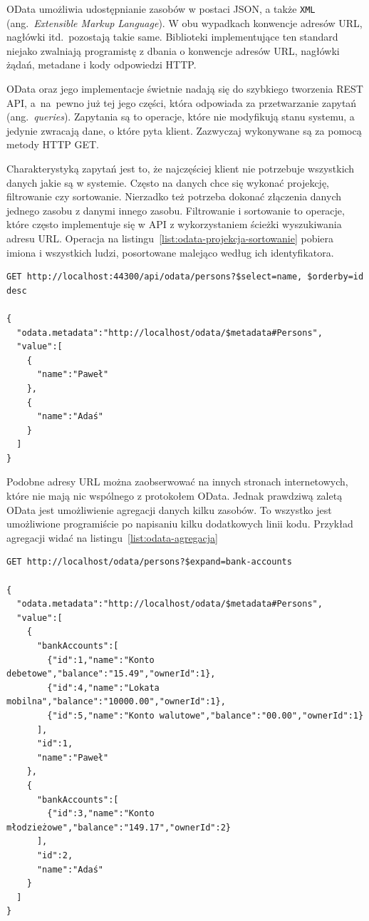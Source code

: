 OData umożliwia udostępnianie zasobów w postaci JSON, a także \texttt{XML} (ang.~\emph{Extensible Markup Language}). W obu wypadkach konwencje adresów URL, nagłówki itd.~pozostają takie same.
Biblioteki implementujące ten standard niejako zwalniają programistę z dbania o konwencje adresów URL, nagłówki żądań, metadane i kody odpowiedzi HTTP. 

OData oraz jego implementacje świetnie nadają się do szybkiego tworzenia REST API, a~na~pewno już tej jego części, która odpowiada za przetwarzanie zapytań (ang.~\emph{queries}). Zapytania są to operacje, które nie modyfikują stanu systemu, a jedynie zwracają dane, o które pyta klient. Zazwyczaj wykonywane są za pomocą metody HTTP GET. 

Charakterystyką zapytań jest to, że najczęściej klient nie potrzebuje wszystkich danych jakie są w systemie. Często na danych chce się wykonać projekcję, filtrowanie czy sortowanie. Nierzadko też potrzeba dokonać złączenia danych jednego zasobu z danymi innego zasobu. Filtrowanie i sortowanie to operacje, które często implementuje się w API z wykorzystaniem ścieżki wyszukiwania adresu URL. Operacja na listingu~\ref{list:odata-projekcja-sortowanie} pobiera imiona i wszystkich ludzi, posortowane malejąco według ich identyfikatora.

\begin{lstlisting}[label=list:odata-projekcja-sortowanie,
    caption=OData -- przykład projekcji i sortowania]
GET http://localhost:44300/api/odata/persons?$select=name, $orderby=id desc

{
  "odata.metadata":"http://localhost/odata/$metadata#Persons",
  "value":[
    {
      "name":"Paweł"
    },
    {
      "name":"Adaś"
    }
  ]
}
\end{lstlisting}

Podobne adresy URL można zaobserwować na innych stronach internetowych, które nie mają nic wspólnego z protokołem OData. Jednak prawdziwą zaletą OData jest umożliwienie agregacji danych kilku zasobów. To wszystko jest umożliwione programiście po napisaniu kilku dodatkowych linii kodu. Przykład agregacji widać na listingu~\ref{list:odata-agregacja}

\begin{lstlisting}[label=list:odata-agregacja,
    caption=OData -- przykład agregacji danych]
GET http://localhost/odata/persons?$expand=bank-accounts

{
  "odata.metadata":"http://localhost/odata/$metadata#Persons",
  "value":[
    {
      "bankAccounts":[
        {"id":1,"name":"Konto debetowe","balance":"15.49","ownerId":1},
        {"id":4,"name":"Lokata mobilna","balance":"10000.00","ownerId":1},
        {"id":5,"name":"Konto walutowe","balance":"00.00","ownerId":1}
      ],
      "id":1,
      "name":"Paweł"
    },
    {
      "bankAccounts":[
        {"id":3,"name":"Konto młodzieżowe","balance":"149.17","ownerId":2}
      ],
      "id":2,
      "name":"Adaś"
    }
  ]
}
\end{lstlisting}


